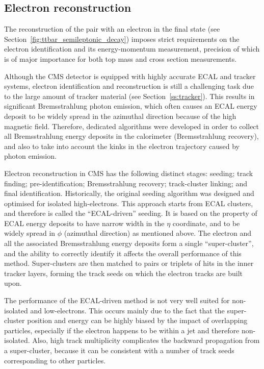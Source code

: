 \subsection{Electron reconstruction}
\label{ss:electron_reconstruction}
The reconstruction of the \ttbar pair with an electron in the final state (see
Section~\ref{fig:ttbar_semileptonic_decay}) imposes strict requirements on the electron identification and its
energy-momentum measurement, precision of which is of major importance for both top mass and
\ttbar cross section measurements.

Although the CMS detector is equipped with highly accurate ECAL and tracker systems, electron identification and
reconstruction is still a challenging task due to the large amount of tracker material (see Section~\ref{ss:tracker}).
This results in significant Bremsstrahlung photon emission, which often causes an ECAL energy deposit to be widely
spread in the azimuthal direction because of the high magnetic field. Therefore, dedicated algorithms were developed in
order to collect all Bremsstrahlung energy deposits in the calorimeter (Bremsstrahlung recovery), and also to take into
account the kinks in the electron trajectory caused by photon emission.

Electron reconstruction in CMS has the following distinct stages: seeding; track finding; pre-identification;
Bremsstrahlung recovery; track-cluster linking; and final identification. Historically, the original seeding algorithm
was designed and optimised for isolated high-\pt electrons. This approach starts from ECAL clusters, and therefore is
called the ``ECAL-driven'' seeding. It is based on the property of ECAL energy deposits to have narrow width in the
$\eta$ coordinate, and to be widely spread in $\phi$ (azimuthal direction) as mentioned above. The electron and all the
associated Bremsstrahlung energy deposits form a single ``super-cluster'', and the ability to correctly identify it
affects the overall performance of this method. Super-clusters are then matched to pairs or triplets of hits in the
inner tracker layers, forming the track seeds on which the electron tracks are built upon.

The performance of the ECAL-driven method is not very well suited for non-isolated and low-\pt electrons. This occurs
mainly due to the fact that the super-cluster position and energy can be highly biased by the impact of overlapping
particles, especially if the electron happens to be within a jet and therefore non-isolated. Also, high track
multiplicity complicates the backward propagation from a super-cluster, because it can be consistent with a number of
track seeds corresponding to other particles.

